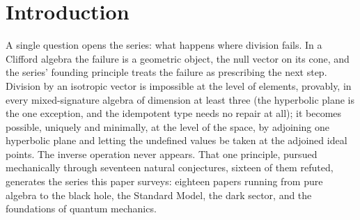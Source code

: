 \documentclass[11pt]{article}
\theoremstyle{definition}
\theoremstyle{plain}
\begin{document}
\noindent{}
\newpage

\section{Introduction}

\label{c:note.programme.setting-introduction}
A single question opens the series: what happens where division fails. In a Clifford algebra the failure is a geometric object, the null vector on its cone, and the series' founding principle treats the failure as prescribing the next step. Division by an isotropic vector is impossible at the level of elements, provably, in every mixed-signature algebra of dimension at least three (the hyperbolic plane is the one exception, and the idempotent type needs no repair at all); it becomes possible, uniquely and minimally, at the level of the space, by adjoining one hyperbolic plane and letting the undefined values be taken at the adjoined ideal points. The inverse operation never appears. That one principle, pursued mechanically through seventeen natural conjectures, sixteen of them refuted, generates the series this paper surveys: eighteen papers running from pure algebra to the black hole, the Standard Model, the dark sector, and the foundations of quantum mechanics.
\end{document}
